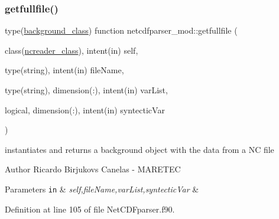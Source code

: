 \subsubsection{\texorpdfstring{getfullfile()}{getfullfile()}}
{\footnotesize\ttfamily type(\mbox{\hyperlink{structbackground__mod_1_1background__class}{background\+\_\+class}}) function netcdfparser\+\_\+mod\+::getfullfile (\begin{DoxyParamCaption}\item[{class(\mbox{\hyperlink{structnetcdfparser__mod_1_1ncreader__class}{ncreader\+\_\+class}}), intent(in)}]{self,  }\item[{type(string), intent(in)}]{file\+Name,  }\item[{type(string), dimension(\+:), intent(in)}]{var\+List,  }\item[{logical, dimension(\+:), intent(in)}]{syntectic\+Var }\end{DoxyParamCaption})\hspace{0.3cm}{\ttfamily [private]}}



instantiates and returns a background object with the data from a NC file 

\begin{DoxyAuthor}{Author}
Ricardo Birjukovs Canelas -\/ M\+A\+R\+E\+T\+EC 
\end{DoxyAuthor}

\begin{DoxyParams}[1]{Parameters}
\mbox{\tt in}  & {\em self,file\+Name,var\+List,syntectic\+Var} & \\
\hline
\end{DoxyParams}


Definition at line 105 of file Net\+C\+D\+Fparser.\+f90.



